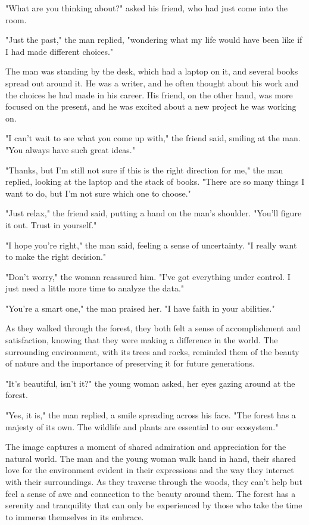 \documentclass[smalldemyvopaper,11pt,twoside,onecolumn,openright,extrafontsizes]{memoir}
\begin{document}
"What are you thinking about?" asked his friend, who had just come into the room.\par
"Just the past," the man replied, "wondering what my life would have been like if I had made different choices."\par
The man was standing by the desk, which had a laptop on it, and several books spread out around it. He was a writer, and he often thought about his work and the choices he had made in his career. His friend, on the other hand, was more focused on the present, and he was excited about a new project he was working on.\par
"I can't wait to see what you come up with," the friend said, smiling at the man. "You always have such great ideas."\par
"Thanks, but I'm still not sure if this is the right direction for me," the man replied, looking at the laptop and the stack of books. "There are so many things I want to do, but I'm not sure which one to choose."\par
"Just relax," the friend said, putting a hand on the man's shoulder. "You'll figure it out. Trust in yourself."\par
"I hope you're right," the man said, feeling a sense of uncertainty. "I really want to make the right decision."\par
"Don't worry," the woman reassured him. "I've got everything under control. I just need a little more time to analyze the data."\par
"You're a smart one," the man praised her. "I have faith in your abilities."\par
As they walked through the forest, they both felt a sense of accomplishment and satisfaction, knowing that they were making a difference in the world. The surrounding environment, with its trees and rocks, reminded them of the beauty of nature and the importance of preserving it for future generations.\par
"It's beautiful, isn't it?" the young woman asked, her eyes gazing around at the forest.\par
"Yes, it is," the man replied, a smile spreading across his face. "The forest has a majesty of its own. The wildlife and plants are essential to our ecosystem."\par
The image captures a moment of shared admiration and appreciation for the natural world. The man and the young woman walk hand in hand, their shared love for the environment evident in their expressions and the way they interact with their surroundings. As they traverse through the woods, they can't help but feel a sense of awe and connection to the beauty around them. The forest has a serenity and tranquility that can only be experienced by those who take the time to immerse themselves in its embrace.\par
\end{document}
